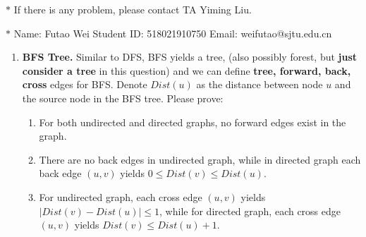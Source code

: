 \documentclass[12pt,a4paper]{article}
\theoremstyle{definition}
\begin{document}
\noindent

\noindent{}
\begin{center}
\footnotesize{\color{red}$*$ If there is any problem, please contact TA Yiming Liu.}

\footnotesize{\color{blue}$*$ Name: Futao Wei  \quad Student ID: 518021910750 \quad Email: weifutao@sjtu.edu.cn}
\end{center}

\begin{enumerate}
    \item
    \textbf{BFS Tree.} Similar to DFS, BFS yields a tree, (also possibly forest, but \textbf{just consider a tree} in this question) and we can define \textbf{tree, forward, back, cross} edges for BFS. Denote $Dist(u)$ as the distance between node $u$ and the source node in the BFS tree. Please prove:
    \begin{enumerate}
    	\item For both undirected and directed graphs, no forward edges exist in the graph.
    	
    	\item There are no back edges in undirected graph, while in directed graph each back edge $(u,v)$ yields $0\leq Dist(v)\leq Dist(u)$.
    	
    	\item For undirected graph, each cross edge $(u,v)$ yields $|Dist(v)-Dist(u)|\le 1$, while for directed graph, each cross edge $(u,v)$ yields $Dist(v)\leq Dist(u)+1$.
    	
    \end{enumerate}
	

\end{enumerate}
\end{document}
